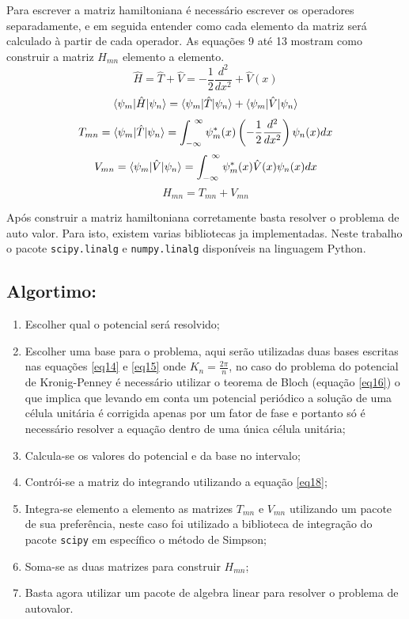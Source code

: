 \documentclass[11pt]{article}
\begin{document}
Para escrever a matriz hamiltoniana é necessário escrever os operadores separadamente, e em seguida entender como cada elemento da matriz será calculado à partir de cada operador. As equações 9 até 13 mostram como construir a matriz \(H_{mn}\) elemento a elemento.
\begin{equation}
\hat{H} = \hat{T} + \hat{V} = -\frac{1}{2}\frac{d^2}{dx^2} + \hat{V}(x)
\end{equation}
\begin{equation}
\braket{\psi_m|\hat{H} |\psi_n} = \braket{\psi_m|\hat{T} |\psi_n} + \braket{\psi_m|\hat{V} |\psi_n}
\end{equation}
\begin{equation}
T_{mn} = \braket{\psi_m|\hat{T} |\psi_n} = \int_{-\infty}^{~\infty} \psi_m^{*}(x) \left(-\frac{1}{2} \frac{d^2}{dx^2}\right) \psi_n(x) dx
\end{equation}
\begin{equation}
V_{mn} = \braket{\psi_m|\hat{V} |\psi_n} = \int_{-\infty}^{~\infty} \psi_m^{*}(x)  \hat{V}(x)  \psi_n(x) dx
\end{equation}
\begin{equation}
H_{mn} = T_{mn} + V_{mn}
\end{equation}

Após construir a matriz hamiltoniana corretamente  basta resolver o problema de auto valor. Para isto, existem varias bibliotecas ja implementadas. Neste trabalho o pacote \texttt{scipy.linalg} e \texttt{numpy.linalg}  disponíveis na linguagem Python.

\subsection{Algortimo:}
\label{sec:org98dc5eb}

\begin{enumerate}
\item Escolher qual o potencial será resolvido;
\item Escolher uma base para o problema, aqui serão utilizadas duas bases escritas nas equações \ref{eq14} e \ref{eq15} onde \(K_n = \frac{2 \pi}{n}\), no caso do problema do potencial de Kronig-Penney é necessário utilizar o teorema de Bloch (equação \ref{eq16}) o que implica que levando em conta um potencial periódico a solução de uma célula unitária é corrigida apenas por um fator de fase e portanto só é necessário resolver a equação dentro de uma única célula unitária;
\item Calcula-se  os valores do potencial e da base no intervalo;
\item Contrói-se a matriz do integrando utilizando a equação \ref{eq18};
\item Integra-se elemento a elemento as matrizes \(T_{mn}\) e \(V_{mn}\) utilizando um pacote de sua preferência, neste caso foi utilizado a biblioteca de integração do pacote  \texttt{scipy} em específico o método de Simpson;
\item Soma-se as duas matrizes para construir \(H_{mn}\);
\item Basta agora utilizar um pacote de algebra linear para resolver o problema de autovalor.
\end{enumerate}
\end{document}
